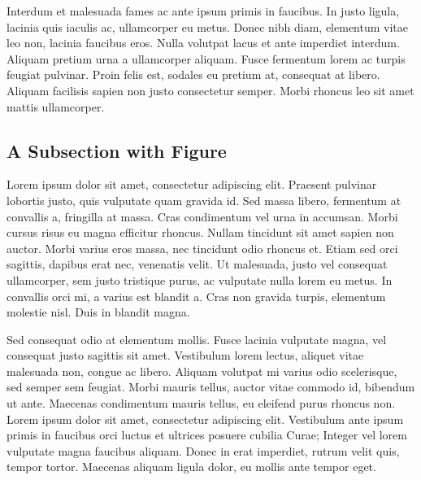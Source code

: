 Interdum et malesuada fames ac ante ipsum primis in faucibus. In justo ligula, 
lacinia quis iaculis ac, ullamcorper eu metus. Donec nibh diam, elementum vitae 
leo non, lacinia faucibus eros. Nulla volutpat lacus et ante imperdiet 
interdum. Aliquam pretium urna a ullamcorper aliquam. Fusce fermentum lorem ac 
turpis feugiat pulvinar. Proin felis est, sodales eu pretium at, consequat at 
libero. Aliquam facilisis sapien non justo consectetur semper. Morbi rhoncus 
leo sit amet mattis ullamcorper.

\subsection{A Subsection with Figure}

Lorem ipsum dolor sit amet, consectetur adipiscing elit. Praesent pulvinar 
lobortis justo, quis vulputate quam gravida id. Sed massa libero, fermentum at 
convallis a, fringilla at massa. Cras condimentum vel urna in accumsan. Morbi 
cursus risus eu magna efficitur rhoncus. Nullam tincidunt sit amet sapien non 
auctor. Morbi varius eros massa, nec tincidunt odio rhoncus et. Etiam sed orci 
sagittis, dapibus erat nec, venenatis velit. Ut malesuada, justo vel consequat 
ullamcorper, sem justo tristique purus, ac vulputate nulla lorem eu metus. In 
convallis orci mi, a varius est blandit a. Cras non gravida turpis, elementum 
molestie nisl. Duis in blandit magna.

Sed consequat odio at elementum mollis. Fusce lacinia vulputate magna, vel 
consequat justo sagittis sit amet. Vestibulum lorem lectus, aliquet vitae 
malesuada non, congue ac libero. Aliquam volutpat mi varius odio scelerisque, 
sed semper sem feugiat. Morbi mauris tellus, auctor vitae commodo id, bibendum 
ut ante. Maecenas condimentum mauris tellus, eu eleifend purus rhoncus non. 
Lorem ipsum dolor sit amet, consectetur adipiscing elit. Vestibulum ante ipsum 
primis in faucibus orci luctus et ultrices posuere cubilia Curae; Integer vel 
lorem vulputate magna faucibus aliquam. Donec in erat imperdiet, rutrum velit 
quis, tempor tortor. Maecenas aliquam ligula dolor, eu mollis ante tempor eget.

